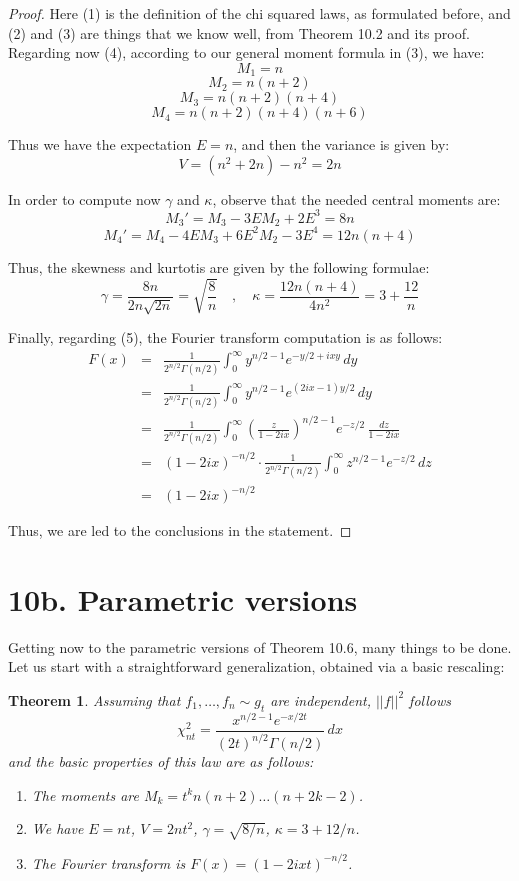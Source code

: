 \documentclass[12pt]{amsbook}
\newtheorem{theorem}{Theorem}[chapter]
\begin{document}
\begin{proof}
Here (1) is the definition of the chi squared laws, as formulated before, and (2) and (3) are things that we know well, from Theorem 10.2 and its proof. Regarding now (4), according to our general moment formula in (3), we have:
$$M_1=n$$
$$M_2=n(n+2)$$
$$M_3=n(n+2)(n+4)$$
$$M_4=n(n+2)(n+4)(n+6)$$

Thus we have the expectation $E=n$, and then the variance is given by:
$$V=(n^2+2n)-n^2=2n$$

In order to compute now $\gamma$ and $\kappa$, observe that the needed central moments are:
$$M_3'=M_3-3EM_2+2E^3=8n$$
$$M_4'=M_4-4EM_3+6E^2M_2-3E^4=12n(n+4)$$

Thus, the skewness and kurtotis are given by the following formulae:
$$\gamma=\frac{8n}{2n\sqrt{2n}}=\sqrt{\frac{8}{n}}\quad,\quad\kappa=\frac{12n(n+4)}{4n^2}=3+\frac{12}{n}$$

Finally, regarding (5), the Fourier transform computation is as follows:
\begin{eqnarray*}
F(x)
&=&\frac{1}{2^{n/2}\Gamma(n/2)}\int_0^\infty y^{n/2-1}e^{-y/2+ixy}\,dy\\
&=&\frac{1}{2^{n/2}\Gamma(n/2)}\int_0^\infty y^{n/2-1}e^{(2ix-1)y/2}\,dy\\
&=&\frac{1}{2^{n/2}\Gamma(n/2)}\int_0^\infty\left(\frac{z}{1-2ix}\right)^{n/2-1}e^{-z/2}\,\frac{dz}{1-2ix}\\
&=&(1-2ix)^{-n/2}\cdot\frac{1}{2^{n/2}\Gamma(n/2)}\int_0^\infty z^{n/2-1}e^{-z/2}\,dz\\
&=&(1-2ix)^{-n/2}
\end{eqnarray*}

Thus, we are led to the conclusions in the statement.
\end{proof}

\section*{10b. Parametric versions}

Getting now to the parametric versions of Theorem 10.6, many things to be done. Let us start with a straightforward generalization, obtained via a basic rescaling:

\begin{theorem}
Assuming that $f_1,\ldots,f_n\sim g_t$ are independent, $||f||^2$ follows
$$\chi_{nt}^2=\frac{x^{n/2-1}e^{-x/2t}}{(2t)^{n/2}\Gamma(n/2)}\,dx$$
and the basic properties of this law are as follows:
\begin{enumerate}
\item The moments are $M_k=t^kn(n+2)\ldots(n+2k-2)$.

\item We have $E=nt$, $V=2nt^2$, $\gamma=\sqrt{8/n}$, $\kappa=3+12/n$.

\item The Fourier transform is $F(x)=(1-2ixt)^{-n/2}$.
\end{enumerate}
\end{theorem}
\end{document}
